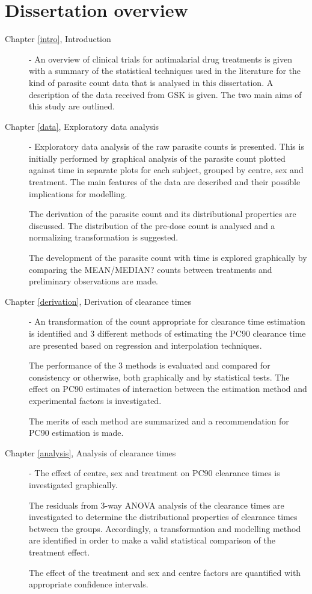 \section{Dissertation overview}
\begin{description}
\item[Chapter \ref{intro}, Introduction] - An overview of clinical trials for antimalarial drug treatments is given with a summary of the statistical techniques used in the literature for the kind of parasite count data that is analysed in this dissertation. A description of the data received from GSK is given. The two main aims of this study are outlined.
\item[Chapter \ref{data}, Exploratory data analysis] - Exploratory data analysis of the raw parasite counts is presented. This is initially performed by graphical analysis of the parasite count plotted against time in separate plots for each subject, grouped by centre, sex and treatment. The main features of the data are described and their possible implications for modelling.

The derivation of the parasite count and its distributional properties are discussed. The distribution of the pre-dose count is analysed and a normalizing transformation is suggested.

The development of the parasite count with time is explored graphically by comparing the MEAN/MEDIAN? counts between treatments and preliminary observations are made.
\item[Chapter \ref{derivation}, Derivation of clearance times] - An transformation of the count appropriate for clearance time estimation is identified and 3 different methods of estimating the PC90 clearance time are presented based on regression and interpolation techniques.

The performance of the 3 methods is evaluated and compared for consistency or otherwise, both graphically and by statistical tests. The effect on PC90 estimates of interaction between the estimation method and experimental factors is investigated.

The merits of each method are summarized and a recommendation for PC90 estimation is made.
\item[Chapter \ref{analysis}, Analysis of clearance times] - The effect of centre, sex and treatment on PC90 clearance times is investigated graphically.

The residuals from 3-way ANOVA analysis of the clearance times are investigated to determine the distributional properties of clearance times between the groups. Accordingly, a transformation and modelling method are identified in order to make a valid statistical comparison of the treatment effect.

The effect of the treatment and sex and centre factors are quantified with appropriate confidence intervals.
\end{description}
